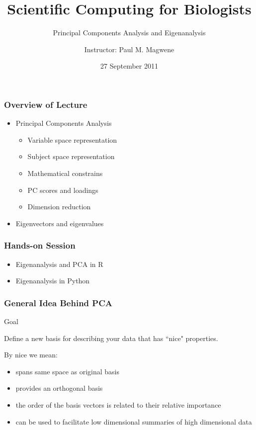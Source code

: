 \documentclass{beamer}
\title{Scientific Computing for Biologists}
\subtitle{Principal Components Analysis and Eigenanalysis} %
\author{Instructor: Paul M. Magwene}
\date{27 September 2011}
\begin{document}
\begin{frame}
\titlepage
\end{frame}

\begin{frame}
  \frametitle{Overview of Lecture}
  
\begin{itemize}
		\item Principal Components Analysis
		\begin{itemize}
			\item Variable space representation
			\item Subject space representation
			\item Mathematical constrains
			\item PC scores and loadings
			\item Dimension reduction			
		\end{itemize}		
		\item Eigenvectors and eigenvalues	
\end{itemize}

\end{frame}

\begin{frame}
  \frametitle{Hands-on Session}
\begin{itemize}
    \item Eigenanalysis and PCA in R
    \item Eigenanalysis in Python
\end{itemize} 


\end{frame}		





\begin{frame}
  \frametitle{General Idea Behind PCA}


\begin{block}{Goal}

Define a new basis for describing your data that has ``nice" properties.

\end{block}
\medskip

By nice we mean:
\begin{itemize}
	\item spans same space as original basis
	\item provides an orthogonal basis
	\item the order of the basis vectors is related to their relative importance
	\item can be used to facilitate low dimensional summaries of high dimensional data
\end{itemize}


\end{frame}
\end{document}
